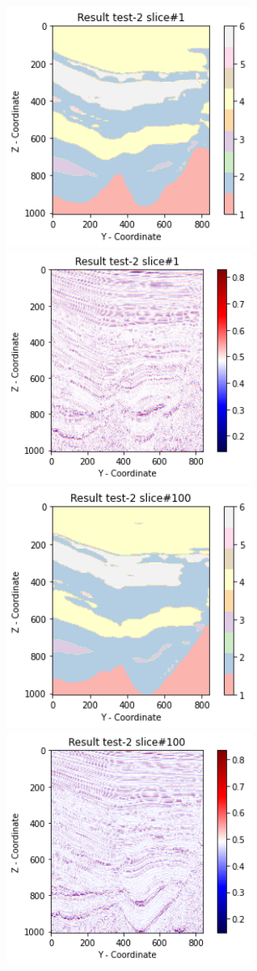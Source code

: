 \documentclass[twoside,letterpaper,twocolumn]{article}
\begin{document}
\begin{figure}[ht!]
	\centering
	\includegraphics[width=8cm]{Figures/predict1.png}
	\includegraphics[width=8cm]{Figures/seismic1.png}
	\includegraphics[width=8cm]{Figures/predict100.png}
	\includegraphics[width=8cm]{Figures/seismic100.png}

\end{figure}
\end{document}
